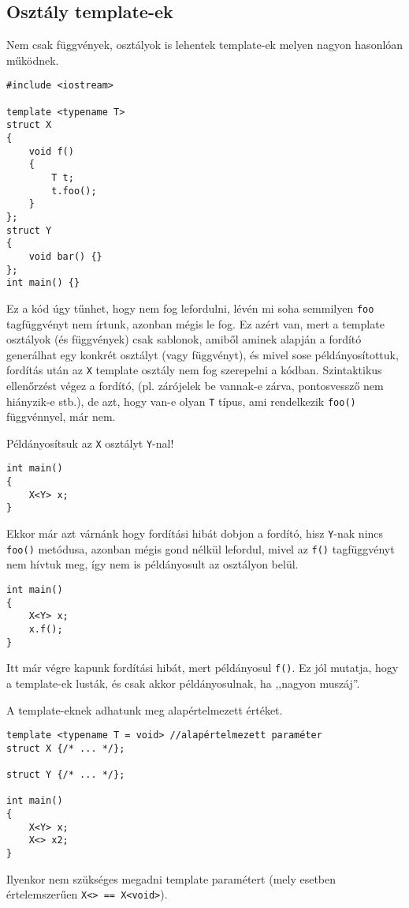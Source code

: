 \documentclass[a4paper,11.5pt,table]{article}
\begin{document}
	\subsection{Osztály template-ek}
	Nem csak függvények, osztályok is lehentek template-ek melyen nagyon hasonlóan működnek.
	\begin{lstlisting}
#include <iostream>

template <typename T>
struct X
{
	void f()
	{
		T t;
		t.foo();
	}
};
struct Y
{
	void bar() {}
};
int main() {}
	\end{lstlisting}
	Ez a kód úgy tűnhet, hogy nem fog lefordulni, lévén mi soha semmilyen \texttt{foo} tagfüggvényt nem írtunk, azonban mégis le fog. Ez azért van, mert a template osztályok (és függvények) csak sablonok, amiből aminek alapján a fordító generálhat egy konkrét osztályt (vagy függvényt), és mivel sose példányosítottuk, fordítás után az \texttt{X} template osztály nem fog szerepelni a kódban. Szintaktikus ellenőrzést végez a fordító, (pl. zárójelek be vannak-e zárva, pontosvessző nem hiányzik-e stb.), de azt, hogy van-e olyan \texttt{T} típus, ami rendelkezik \texttt{foo()} függvénnyel, már nem.
	
	\smallskip
	Példányosítsuk az \texttt{X} osztályt \texttt{Y}-nal!
\begin{lstlisting}
int main()
{
	X<Y> x;
}
\end{lstlisting}
	Ekkor már azt várnánk hogy fordítási hibát dobjon a fordító, hisz \texttt{Y}-nak nincs \texttt{foo()} metódusa, azonban mégis gond nélkül lefordul, mivel az \texttt{f()} tagfüggvényt nem hívtuk meg, így nem is példányosult az osztályon belül.
	\begin{lstlisting}
int main()
{
	X<Y> x;
	x.f();
}
	\end{lstlisting}
	Itt már végre kapunk fordítási hibát, mert példányosul \texttt{f()}. Ez jól mutatja, hogy a template-ek lusták, és csak akkor példányosulnak, ha ,,nagyon muszáj''.
	\medskip
	
	A template-eknek adhatunk meg alapértelmezett értéket.

\begin{lstlisting}
template <typename T = void> //alapértelmezett paraméter
struct X {/* ... */};

struct Y {/* ... */};

int main()
{
	X<Y> x;
	X<> x2;
}
\end{lstlisting}
	Ilyenkor nem szükséges megadni template paramétert (mely esetben értelemszerűen \texttt{X<> == X<void>}). 
	
\end{document}
